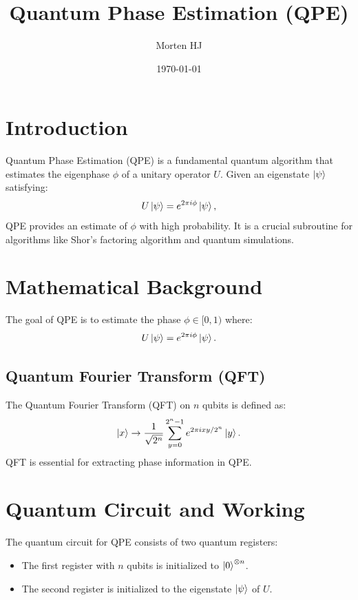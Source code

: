 \documentclass[11pt]{article}
\title{Quantum Phase Estimation (QPE)}
\author{Morten HJ}
\date{\today}
\begin{document}
\maketitle
\tableofcontents
\newpage

\section{Introduction}
Quantum Phase Estimation (QPE) is a fundamental quantum algorithm that estimates the eigenphase $\phi$ of a unitary operator $U$. Given an eigenstate $\ket{\psi}$ satisfying:
\begin{equation}
    U\ket{\psi} = e^{2\pi i \phi} \ket{\psi},
\end{equation}
QPE provides an estimate of $\phi$ with high probability. It is a crucial subroutine for algorithms like Shor's factoring algorithm and quantum simulations.

\section{Mathematical Background}
The goal of QPE is to estimate the phase $\phi \in [0,1)$ where:
\begin{equation}
    U\ket{\psi} = e^{2\pi i \phi} \ket{\psi}.
\end{equation}

\subsection{Quantum Fourier Transform (QFT)}
The Quantum Fourier Transform (QFT) on $n$ qubits is defined as:
\begin{equation}
    \ket{x} \rightarrow \frac{1}{\sqrt{2^n}}\sum_{y=0}^{2^n-1} e^{2\pi i xy / 2^n}\ket{y}.
\end{equation}
QFT is essential for extracting phase information in QPE.

\newpage

\section{Quantum Circuit and Working}
The quantum circuit for QPE consists of two quantum registers:
\begin{itemize}
    \item The first register with $n$ qubits is initialized to $\ket{0}^{\otimes n}$.
    \item The second register is initialized to the eigenstate $\ket{\psi}$ of $U$.
\end{itemize}
\end{document}
